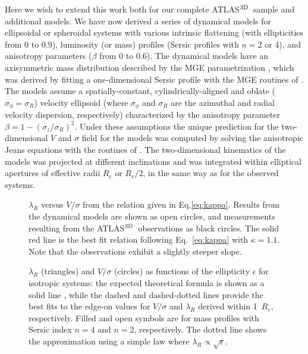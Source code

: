 \documentclass[useAMS,usenatbib,usegraphicx]{mn2e}
\newcommand{\atlas}{{ATLAS$^{\rm 3D}$}}
\begin{document}
Here we wish to extend this work both for our complete \atlas\ sample and additional models. 
We have now derived a series of dynamical models for ellipsoidal or spheroidal systems with various intrinsic 
flattening (with ellipticities from 0 to 0.9), luminosity (or mass) profiles (Sersic profiles 
with $n = 2$ or 4), and anisotropy parameters ($\beta$ from 0 to 0.6). 
The dynamical models have an axisymmetric mass distribution described by the MGE parametrization 
\citep{Emsellem+94}, which was derived by fitting a one-dimensional Sersic profile with the MGE 
routines of \cite{Cappellari02}. The models assume a spatially-constant, cylindrically-aligned 
and oblate ($\sigma_{\phi} = \sigma_R$) velocity ellipsoid (where
$\sigma_{\phi}$ and $\sigma_R$ are the azimuthal and radial velocity dispersion,
respectively) characterized by the anisotropy parameter $\beta = 1 - {\left(\sigma_z /
\sigma_R \right)}^2$. Under these assumptions the unique prediction for the two-dimensional $V$ and 
$\sigma$ field for the models was computed by solving the anisotropic Jeans equations with the 
routines of \cite{Cappellari08}. The two-dimensional kinematics of the models was projected at 
different inclinations and was integrated within elliptical apertures of effective radii $R_e$ or $R_e / 2$, 
in the same way as for the observed systems.
\begin{figure}
\centering
{}
\caption{$\lambda_R$ versus $V/\sigma$ from the relation given in Eq.\ref{eq:kappa}. 
Results from the dynamical models are shown as open circles, and measurements resulting from the 
\atlas\ observations as black circles. The solid red line is the best fit relation following
Eq.~\ref{eq:kappa} with $\kappa = 1.1$. Note that the observations exhibit a
slightly steeper slope.}
\label{fig:LRVS}
\end{figure}

\begin{figure}
\centering
{}
\caption{$\lambda_R$ (triangles) and $V/\sigma$ (circles) as functions of the ellipticity $\epsilon$ for isotropic systems:
the expected theoretical formula is shown as a solid line \citep[with $\alpha=0.15$, see][for details and notations]{Binney05}, 
while the dashed and
dashed-dotted lines provide the best fits to the edge-on values for $V/\sigma$ and $\lambda_R$ derived within 1~$R_e$, respectively. Filled and open symbols are for mass profiles with Sersic index $n=4$ and $n=2$, respectively. The dotted line shows the approximation using a simple law where $\lambda_R \propto \sqrt{\epsilon}$.}
\label{fig:edgeon}
\end{figure}
\end{document}
